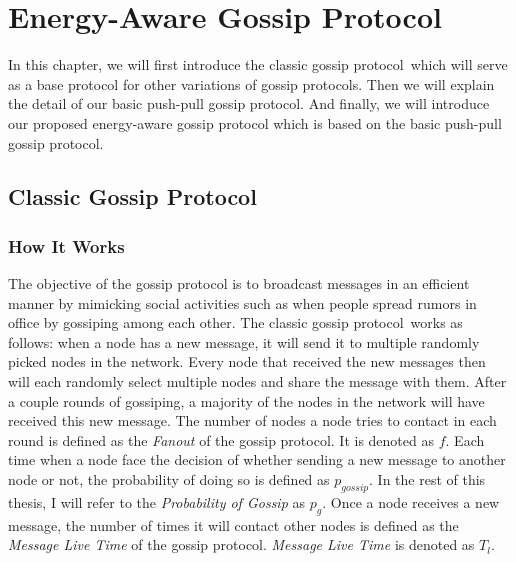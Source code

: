 \documentclass[onehalf,11pt]{beavtex}
\newcommand{\gp}{gossip protocol}
\newcommand{\pog}{Probability of Gossip}
\begin{document}



\chapter{Energy-Aware Gossip Protocol}
\label{Chapter3}

In this chapter, we will first introduce the classic \gp ~which will serve as a base protocol for other variations of gossip protocols. Then we will explain the detail of our basic push-pull \gp. And finally, we will introduce our proposed energy-aware gossip protocol which is based on the basic push-pull \gp.

\section{Classic Gossip Protocol}
\subsection{How It Works} \label{basic gossip}

The objective of the gossip protocol is to broadcast messages in an efficient manner by mimicking social activities such as when people spread rumors in office by gossiping among each other. The classic \gp ~works as follows: when a node has a new message, it will send it to multiple randomly picked nodes in the network. Every node that received the new messages then will each randomly select multiple nodes and share the message with them. After a couple rounds of gossiping, a majority of the nodes in the network will have received this new message. The number of nodes a node tries to contact in each round is defined as the \emph{Fanout} of the \gp. It is denoted as $f$. Each time when a node face the decision of whether sending a new message to another node or not, the probability of doing so is defined as $p_{gossip}$. In the rest of this thesis, I will refer to the \emph{\pog} as $p_g$. Once a node receives a new message, the number of times it will contact other nodes is defined as the \emph{Message Live Time} of the \gp. \emph{Message Live Time} is denoted as $T_l$.
\end{document}
